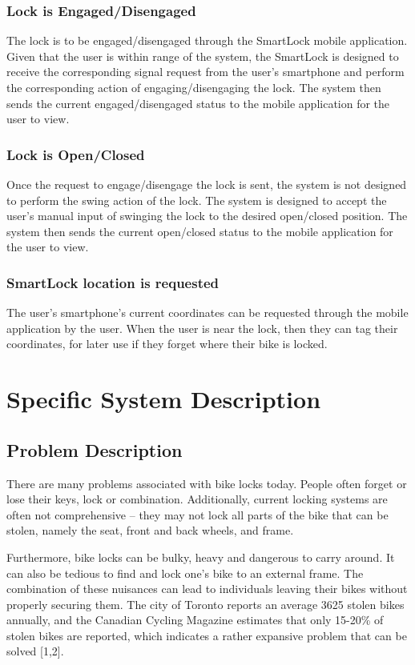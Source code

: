 \documentclass[12pt]{article}
\begin{document}
\subsubsection{Lock is Engaged/Disengaged}
The lock is to be engaged/disengaged through the SmartLock mobile application.  Given that the user is within range of the system, the SmartLock is designed to receive the corresponding signal request from the user’s smartphone and perform the corresponding action of engaging/disengaging the lock.  The system then sends the current engaged/disengaged status to the mobile application for the user to view.
\subsubsection{Lock is Open/Closed}
Once the request to engage/disengage the lock is sent, the system is not designed to perform the swing action of the lock.  The system is designed to accept the user’s manual input of swinging the lock to the desired open/closed position.  The system then sends the current open/closed status to the mobile application for the user to view. 
\subsubsection{SmartLock location is requested}
The user’s smartphone's current coordinates can be requested through the mobile application by the user.  When the user is near the lock, then they can tag their coordinates, for later use if they forget where their bike is locked.  

\section{Specific System Description}


\subsection{Problem Description} \label{Sec_pd}

There are many problems associated with bike locks today.  People often forget or lose their keys, lock or combination.  Additionally, current locking systems are often not comprehensive – they may not lock all parts of the bike that can be stolen, namely the seat, front and back wheels, and frame.  


Furthermore, bike locks can be bulky, heavy and dangerous to carry around. It can also be tedious to find and lock one’s bike to an external frame.  The combination of these nuisances can lead to individuals leaving their bikes without properly securing them.  The city of Toronto reports an average 3625 stolen bikes annually, and the Canadian Cycling Magazine estimates that only 15-20\% of stolen bikes are reported, which indicates a rather expansive problem that can be solved [1,2].  
\end{document}
